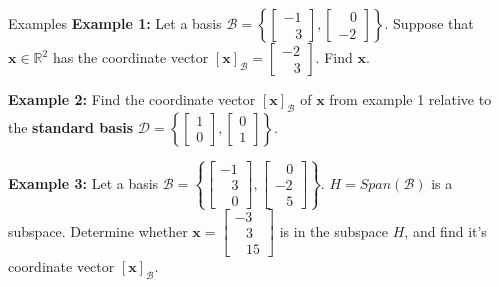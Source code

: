 \documentclass[10pt, aspectratio=169]{beamer}
\begin{document}
\begin{frame}{Examples}
    \textbf{Example 1:}
    Let a basis \(\mathcal{B}=\left\{\begin{bmatrix} -1\\\;\;\;3\end{bmatrix},
    \begin{bmatrix} \;\;\;0\\ -2\end{bmatrix}\right\}\).
    Suppose that \(\mathbf{x}\in\mathbb{R}^2\) has the coordinate vector
    \([\mathbf{x}]_{\mathcal{B}}=\begin{bmatrix} -2\\ \;\;\;3\end{bmatrix}\).
    Find \(\mathbf{x}\).

    \textbf{Example 2:}
    Find the coordinate vector \([\mathbf{x}]_{\mathcal{B}}\) of \(\mathbf{x}\) from example 1 relative to the \textbf{standard basis} \(\mathcal{D}=\left\{\begin{bmatrix} 1\\0\end{bmatrix},
    \begin{bmatrix} 0\\ 1\end{bmatrix}\right\}\).

    \textbf{Example 3:}
    Let a basis \(\mathcal{B}=\left\{\begin{bmatrix} -1\\\;\;\;3\\ \;\;\;0\end{bmatrix},
    \begin{bmatrix} \;\;\;0\\ -2\\ \;\;\;5\end{bmatrix}\right\}\).
    \(H=Span(\mathcal{B})\) is a subspace.
    Determine whether \(\mathbf{x}=\begin{bmatrix} -3\\\;\;\;3\\\;\;\;15\end{bmatrix}\) is in the subspace \(H\), and find it's coordinate vector \([\mathbf{x}]_{\mathcal{B}}\).
\end{frame}

    
\end{document}
